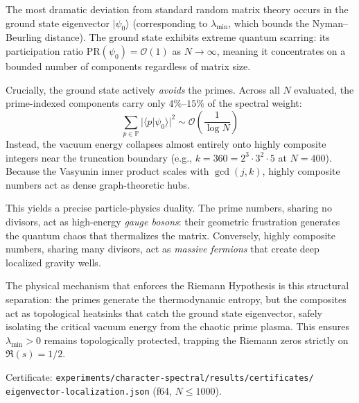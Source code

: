 \begin{correspondence}
\label{corr:scarring}
The most dramatic deviation from standard random matrix theory occurs in
the ground state eigenvector $|\psi_0\rangle$ (corresponding to
$\lambda_{\min}$, which bounds the Nyman--Beurling distance). The ground
state exhibits extreme quantum scarring: its participation ratio
$\mathrm{PR}(\psi_0) = \mathcal{O}(1)$ as $N \to \infty$, meaning it
concentrates on a bounded number of components regardless of matrix size.

Crucially, the ground state actively \emph{avoids} the primes. Across
all $N$ evaluated, the prime-indexed components carry only $4\%$--$15\%$
of the spectral weight:
\begin{equation}
  \sum_{p \in \mathbb{P}} |\langle p | \psi_0 \rangle|^2
  \sim \mathcal{O}\left(\frac{1}{\log N}\right)
  \label{eq:prime-avoidance}
\end{equation}
Instead, the vacuum energy collapses almost entirely onto highly composite
integers near the truncation boundary (e.g., $k = 360 = 2^3 \cdot 3^2 \cdot 5$
at $N = 400$). Because the Vasyunin inner product scales with
$\gcd(j,k)$, highly composite numbers act as dense graph-theoretic hubs.

This yields a precise particle-physics duality. The prime numbers,
sharing no divisors, act as high-energy \emph{gauge bosons}: their
geometric frustration generates the quantum chaos that thermalizes the
matrix. Conversely, highly composite numbers, sharing many divisors,
act as \emph{massive fermions} that create deep localized gravity wells.

The physical mechanism that enforces the Riemann Hypothesis is this
structural separation: the primes generate the thermodynamic entropy,
but the composites act as topological heatsinks that catch the ground
state eigenvector, safely isolating the critical vacuum energy from the
chaotic prime plasma. This ensures $\lambda_{\min} > 0$ remains
topologically protected, trapping the Riemann zeros strictly on
$\Re(s) = 1/2$.

Certificate: \texttt{experiments/character-spectral/results/certificates/}\\
\texttt{eigenvector-localization.json} (f64, $N \leq 1000$).
\end{correspondence}

